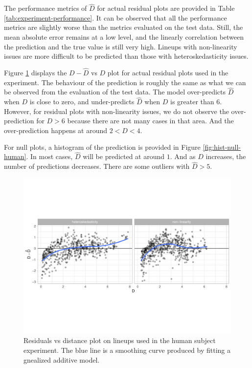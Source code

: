 \documentclass[]{interact}
\theoremstyle{plain}%
\theoremstyle{definition}
\theoremstyle{remark}
\begin{document}
The performance metrics of \(\hat{D}\) for actual residual plots are
provided in Table \ref{tab:experiment-performance}. It can be observed
that all the performance metrics are slightly worse than the metrics
evaluated on the test data. Still, the mean absolute error remains at a
low level, and the linearly correlation between the prediction and the
true value is still very high. Lineups with non-linearity issues are
more difficult to be predicted than those with heteroskedasticity
issues.

Figure \ref{fig:rd-human} displays the \(D - \hat{D}\) vs \(D\) plot for
actual residual plots used in the experiment. The behaviour of the
prediction is roughly the same as what we can be observed from the
evaluation of the test data. The model over-predicts \(\hat{D}\) when
\(D\) is close to zero, and under-predicts \(\hat{D}\) when \(D\) is
greater than \(6\). However, for residual plots with non-linearity
issues, we do not observe the over-prediction for \(D > 6\) because
there are not many cases in that area. And the over-prediction happens
at around \(2 < D < 4\).

For null plots, a histogram of the prediction is provided in Figure
\ref{fig:hist-null-human}. In most cases, \(\hat{D}\) will be predicted
at around \(1\). And as \(\hat{D}\) increases, the number of predictions
decreases. There are some outliers with \(\hat{D} > 5\).

\begin{figure}

{\centering \includegraphics[width=1\linewidth]{paper_files/figure-latex/rd-human-1} 

}

\caption{Residuals vs distance plot on lineups used in the human subject experiment. The blue line is a smoothing curve produced by fitting a gnealized additive model.}\label{fig:rd-human}
\end{figure}
\end{document}
